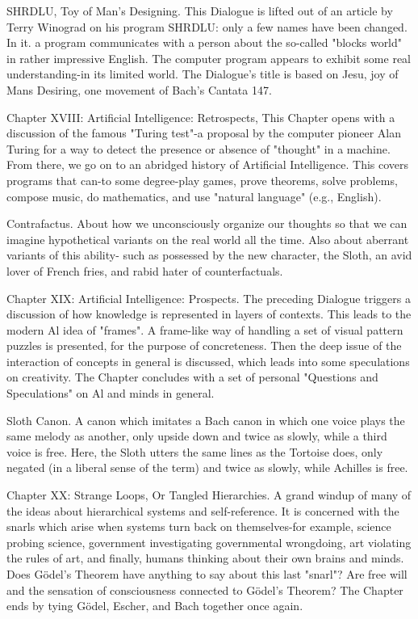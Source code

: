 SHRDLU, Toy of Man's Designing. This Dialogue is lifted out of an article by Terry Winograd on
  his program SHRDLU: only a few names have been changed. In it. a program communicates
  with a person about the so-called "blocks world" in rather impressive English. The computer
  program appears to exhibit some real understanding-in its limited world. The Dialogue's title is
  based on Jesu, joy of Mans Desiring, one movement of Bach's Cantata 147.

Chapter XVIII: Artificial Intelligence: Retrospects, This Chapter opens with a discussion of the
  famous "Turing test"-a proposal by the computer pioneer Alan Turing for a way to detect the
  presence or absence of "thought" in a machine. From there, we go on to an abridged history of
  Artificial Intelligence. This covers programs that can-to some degree-play games, prove
  theorems, solve problems, compose music, do mathematics, and use "natural language" (e.g.,
  English).





Contrafactus. About how we unconsciously organize our thoughts so that we can imagine
  hypothetical variants on the real world all the time. Also about aberrant variants of this ability-
  such as possessed by the new character, the Sloth, an avid lover of French fries, and rabid hater of
  counterfactuals.

Chapter XIX: Artificial Intelligence: Prospects. The preceding Dialogue triggers a discussion of
  how knowledge is represented in layers of contexts. This leads to the modern Al idea of "frames".
  A frame-like way of handling a set of visual pattern puzzles is presented, for the purpose of
  concreteness. Then the deep issue of the interaction of concepts in general is discussed, which
  leads into some speculations on creativity. The Chapter concludes with a set of personal
  "Questions and Speculations" on Al and minds in general.

Sloth Canon. A canon which imitates a Bach canon in which one voice plays the same melody as
   another, only upside down and twice as slowly, while a third voice is free. Here, the Sloth utters
   the same lines as the Tortoise does, only negated (in a liberal sense of the term) and twice as
   slowly, while Achilles is free.

Chapter XX: Strange Loops, Or Tangled Hierarchies. A grand windup of many of the ideas
  about hierarchical systems and self-reference. It is concerned with the snarls which arise when
  systems turn back on themselves-for example, science probing science, government investigating
  governmental wrongdoing, art violating the rules of art, and finally, humans thinking about their
  own brains and minds. Does Gödel’s Theorem have anything to say about this last "snarl"? Are
  free will and the sensation of consciousness connected to Gödel’s Theorem? The Chapter ends by
  tying Gödel, Escher, and Bach together once again.

